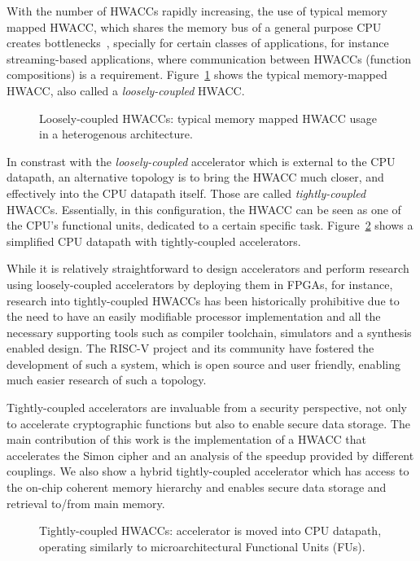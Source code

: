 \documentclass[10pt,conference]{IEEEtran}
\begin{document}
With the number of HWACCs rapidly increasing, the use of typical memory mapped HWACC,
which shares the memory bus of a general purpose CPU creates bottlenecks~\cite{TSS},
specially for certain classes of applications, for instance streaming-based
applications, where communication between HWACCs (function compositions) is a requirement.
Figure~\ref{fig:loosely} shows the typical memory-mapped HWACC, also called a
\textit{loosely-coupled} HWACC.

\begin{figure}
  \centering
  
  \caption{Loosely-coupled HWACCs: typical memory mapped HWACC usage in a heterogenous architecture.}
  \label{fig:loosely}
\end{figure}

In constrast with the \textit{loosely-coupled} accelerator which is external to
the CPU datapath, an alternative topology is to bring the HWACC much closer, and
effectively into the CPU datapath itself. Those are called
\textit{tightly-coupled} HWACCs. Essentially, in this configuration, the HWACC
can be seen as one of the CPU's functional units, dedicated to a certain
specific task. Figure~\ref{fig:tightly} shows a simplified CPU datapath with
tightly-coupled accelerators.

While it is relatively straightforward to design accelerators and perform research using
loosely-coupled accelerators by deploying them in FPGAs, for instance, research
into tightly-coupled HWACCs has been historically prohibitive due to the need to
have an easily modifiable processor implementation and all the necessary
supporting tools such as compiler toolchain, simulators and a synthesis enabled
design. The RISC-V project and its community have fostered the development of
such a system, which is open source and user friendly, enabling much easier
research of such a topology.

Tightly-coupled accelerators are invaluable from a security perspective, not
only to accelerate cryptographic functions but also to enable secure data
storage. The main contribution of this work is the implementation of a HWACC
that accelerates the Simon cipher and an analysis of the speedup provided by
different couplings. We also show a hybrid tightly-coupled accelerator which has
access to the on-chip coherent memory hierarchy and enables secure data storage
and retrieval to/from main memory.

\begin{figure}
  \centering
  \caption{Tightly-coupled HWACCs: accelerator is moved into CPU datapath,
    operating similarly to microarchitectural Functional Units (FUs).}
  \label{fig:tightly}
\end{figure}
\end{document}
